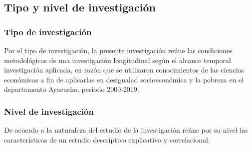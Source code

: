 \subsection{Tipo y nivel de investigación}

	\subsubsection{Tipo de investigación}

Por el tipo de investigación, la presente investigación reúne las condiciones metodológicas de una investigación longitudinal según el alcance temporal investigación aplicada, en razón que se utilizaron conocimientos de las ciencias económicas a fin de aplicarlas en desigualad socioeconómica y la pobreza en el departamento Ayacucho, periodo 2000-2019.
	
	\subsubsection{Nivel de investigación}
De acuerdo a la naturaleza del estudio de la investigación reúne por su nivel las características de un estudio descriptivo explicativo y correlacional.




